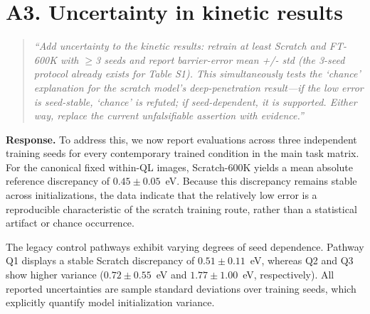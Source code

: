 \documentclass[11pt]{article}
\begin{document}
\section*{A3. Uncertainty in kinetic results}

\begin{quote}\small \itshape
``Add uncertainty to the kinetic results: retrain at least Scratch and FT-600K with $\geq$3 seeds and report barrier-error mean +/- std (the 3-seed protocol already exists for Table S1). This simultaneously tests the `chance' explanation for the scratch model's deep-penetration result---if the low error is seed-stable, `chance' is refuted; if seed-dependent, it is supported. Either way, replace the current unfalsifiable assertion with evidence.''\end{quote}

\textbf{Response.} 
To address this, we now report evaluations across three independent training seeds for every contemporary trained condition in the main task matrix. For the canonical fixed within-QL images, Scratch-600K yields a mean absolute reference discrepancy of $0.45\pm0.05$~eV. Because this discrepancy remains stable across initializations, the data indicate that the relatively low error is a reproducible characteristic of the scratch training route, rather than a statistical artifact or chance occurrence.

The legacy control pathways exhibit varying degrees of seed dependence. Pathway Q1 displays a stable Scratch discrepancy of $0.51\pm0.11$~eV, whereas Q2 and Q3 show higher variance ($0.72\pm0.55$~eV and $1.77\pm1.00$~eV, respectively). All reported uncertainties are sample standard deviations over training seeds, which explicitly quantify model initialization variance. 
\end{document}
